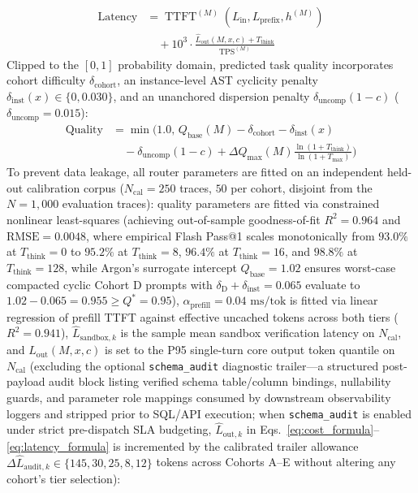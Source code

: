 \documentclass[conference,10pt]{IEEEtran}
\begin{document}
\begin{equation}
\label{eq:latency_formula}
\begin{split}
\operatorname{Latency} &= \operatorname{TTFT}^{(M)}(L_{\text{in}}, L_{\text{prefix}}, h^{(M)}) \\
&\quad + 10^3 \cdot \frac{\hat{L}_{\text{out}}(M, x, c) + T_{\text{think}}}{\operatorname{TPS}^{(M)}}
\end{split}
\end{equation}
Clipped to the $[0, 1]$ probability domain, predicted task quality incorporates cohort difficulty $\delta_{\text{cohort}}$, an instance-level AST cyclicity penalty $\delta_{\text{inst}}(x) \in \{0, 0.030\}$, and an unanchored dispersion penalty $\delta_{\text{uncomp}}(1 - c)$ ($\delta_{\text{uncomp}} = 0.015$):
\begin{equation}
\label{eq:quality_scaling}
\begin{aligned}
\operatorname{Quality} &= \min\!\Bigg(1.0,\, Q_{\text{base}}(M) - \delta_{\text{cohort}} - \delta_{\text{inst}}(x) \\
&\quad - \delta_{\text{uncomp}}(1 - c) + \Delta Q_{\max}(M) \frac{\ln(1 + T_{\text{think}})}{\ln(1 + T_{\max})}\Bigg)
\end{aligned}
\end{equation}
To prevent data leakage, all router parameters are fitted on an independent held-out calibration corpus ($N_{\text{cal}} = 250$ traces, $50$ per cohort, disjoint from the $N = 1{,}000$ evaluation traces): quality parameters are fitted via constrained nonlinear least-squares (achieving out-of-sample goodness-of-fit $R^2 = 0.964$ and $\text{RMSE} = 0.0048$, where empirical Flash Pass@1 scales monotonically from $93.0\%$ at $T_{\text{think}}=0$ to $95.2\%$ at $T_{\text{think}}=8$, $96.4\%$ at $T_{\text{think}}=16$, and $98.8\%$ at $T_{\text{think}}=128$, while Argon's surrogate intercept $Q_{\text{base}}=1.02$ ensures worst-case compacted cyclic Cohort D prompts with $\delta_{\text{D}} + \delta_{\text{inst}} = 0.065$ evaluate to $1.02 - 0.065 = 0.955 \ge Q^* = 0.95$), $\alpha_{\text{prefill}} = 0.04\text{ ms/tok}$ is fitted via linear regression of prefill TTFT against effective uncached tokens across both tiers ($R^2 = 0.941$), $\hat{L}_{\text{sandbox},k}$ is the sample mean sandbox verification latency on $N_{\text{cal}}$, and $\hat{L}_{\text{out}}(M, x, c)$ is set to the P95 single-turn core output token quantile on $N_{\text{cal}}$ (excluding the optional \texttt{schema\_audit} diagnostic trailer---a structured post-payload audit block listing verified schema table/column bindings, nullability guards, and parameter role mappings consumed by downstream observability loggers and stripped prior to SQL/API execution; when \texttt{schema\_audit} is enabled under strict pre-dispatch SLA budgeting, $\hat{L}_{\text{out},k}$ in Eqs.~\ref{eq:cost_formula}--\ref{eq:latency_formula} is incremented by the calibrated trailer allowance $\Delta\hat{L}_{\text{audit},k} \in \{145, 30, 25, 8, 12\}$ tokens across Cohorts A--E without altering any cohort's tier selection):
\end{document}
